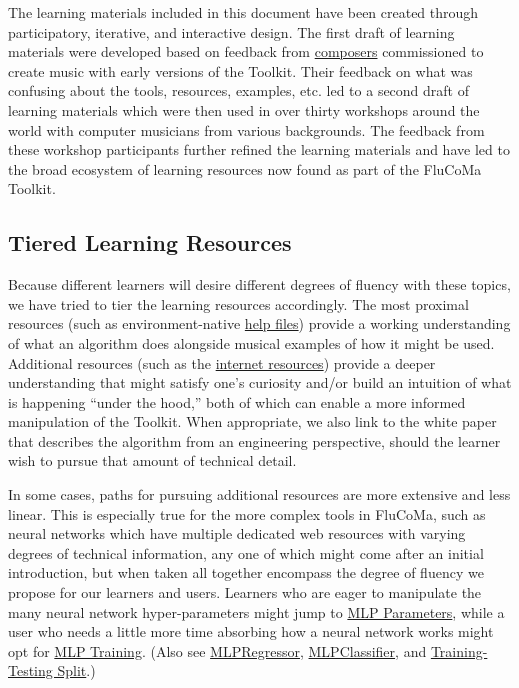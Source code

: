 \documentclass{article}
\begin{document}
The learning materials included in this document have been created
through participatory, iterative, and interactive design. The first
draft of learning materials were developed based on feedback from
\href{https://www.flucoma.org/commissions/}{composers} commissioned to
create music with early versions of the Toolkit. Their feedback on what
was confusing about the tools, resources, examples, etc. led to a second
draft of learning materials which were then used in over thirty
workshops around the world with computer musicians from various
backgrounds. The feedback from these workshop participants further
refined the learning materials and have led to the broad ecosystem of
learning resources now found as part of the FluCoMa Toolkit.

\subsection{Tiered Learning Resources}\label{tiered-learning-resources}

Because different learners will desire different degrees of fluency with
these topics, we have tried to tier the learning resources accordingly.
The most proximal resources (such as environment-native
\hyperref[creative-coding-environment-materials]{help files}) provide a
working understanding of what an algorithm does alongside musical
examples of how it might be used. Additional resources (such as the
\hyperref[web-reference]{internet resources}) provide a deeper
understanding that might satisfy one's curiosity and/or build an
intuition of what is happening ``under the hood,'' both of which can
enable a more informed manipulation of the Toolkit. When appropriate, we
also link to the white paper that describes the algorithm from an
engineering perspective, should the learner wish to pursue that amount
of technical detail.

In some cases, paths for pursuing additional resources are more
extensive and less linear. This is especially true for the more complex
tools in FluCoMa, such as neural networks which have multiple dedicated
web resources with varying degrees of technical information, any one of
which might come after an initial introduction, but when taken all
together encompass the degree of fluency we propose for our learners and
users. Learners who are eager to manipulate the many neural network
hyper-parameters might jump to
\href{https://learn.flucoma.org/learn/mlp-parameters/}{MLP Parameters},
while a user who needs a little more time absorbing how a neural network
works might opt for
\href{https://learn.flucoma.org/learn/mlp-training/}{MLP Training}.
(Also see
\href{https://learn.flucoma.org/reference/mlpregressor/}{MLPRegressor},
\href{https://learn.flucoma.org/reference/mlpclassifier/}{MLPClassifier},
and
\href{https://learn.flucoma.org/learn/training-testing-split/}{Training-Testing
Split}.)
\end{document}
